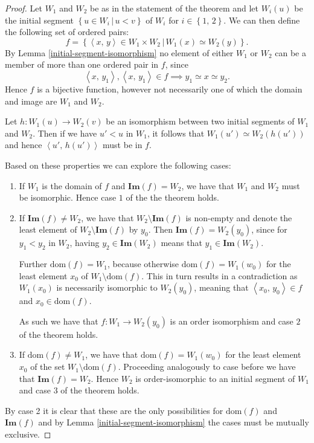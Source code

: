 \documentclass[../../main.tex]{subfiles}
\begin{document}
\begin{proof}\cite[Theorem 1]{Jec78}
    Let $W_1$ and $W_2$ be as in the statement of the theorem and let $W_i(u)$ be the initial segment $\left\{u \in W_i \,\vert\, u < v\right\}$ of $W_i$ for $i \in \left\{1,\, 2\right\}$.
    We can then define the following set of ordered pairs:
    $$f = \left\{\left<x,\, y\right> \in W_1 \times W_2 \,\vert\, W_1(x) \simeq W_2(y)\right\}.$$
    By Lemma \ref{initial-segment-isomorphism} no element of either $W_1$ or $W_2$ can be a member of more than one ordered pair in $f$,
    since $$\left<x,\, y_1\right>, \left<x,\, y_1\right> \in f \implies y_1 \simeq x \simeq y_2.$$
    Hence $f$ is a bijective function, however not necessarily one of which the domain and image are $W_1$ and $W_2$.
    
    Let $h: W_1(u) \to W_2(v)$ be an isomorphism between two initial segments of $W_1$ and $W_2$.
    Then if we have $u' < u$ in $W_1$, it follows that $W_1(u') \simeq W_2(h(u'))$ and hence $\left<u',\, h(u')\right>$ must be in $f$.

    Based on these properties we can explore the following cases:
    \begin{enumerate}
        \item If $W_1$ is the domain of $f$ and $\mathbf{Im}(f) = W_2$, we have that $W_1$ and $W_2$ must be isomorphic.
        Hence case $1$ of the the theorem holds.
        \item If $\mathbf{Im}(f) \neq W_2$, we have that $W_2 \setminus \mathbf{Im}(f)$ is non-empty and denote the least element of $W_2 \setminus \mathbf{Im}(f)$ by $y_0$.
        Then $\mathbf{Im}(f) = W_2(y_0)$, since for $y_1 < y_2$ in $W_2$, having $y_2 \in \mathbf{Im}(W_2)$ means that $y_1 \in \mathbf{Im}(W_2)$.

        Further $\text{dom}(f) = W_1$, because otherwise $\text{dom}(f) = W_1(w_0)$ for the least element $x_0$ of $W_1 \setminus \text{dom}(f)$.
        This in turn results in a contradiction as $W_1(x_0)$ is necessarily isomorphic to $W_2(y_0)$, meaning that $\left<x_0,\, y_0\right> \in f$ and $x_0 \in \text{dom}(f)$.

        As such we have that $f: W_1 \to W_2(y_0)$ is an order isomorphism and case $2$ of the theorem holds.
        \item If $\text{dom}(f) \neq W_1$, we have that $\text{dom}(f) = W_1(w_0)$ for the least element $x_0$ of the set $W_1 \setminus \text{dom}(f)$.
        Proceeding analogously to case before we have that $\mathbf{Im}(f) = W_2$. 
        Hence $W_2$ is order-isomorphic to an initial segment of $W_1$ and case $3$ of the theorem holds.
    \end{enumerate}
    By case 2 it is clear that these are the only possibilities for $\text{dom}(f)$ and $\mathbf{Im}(f)$ and by Lemma \ref{initial-segment-isomorphism} the cases must be mutually exclusive.
\end{proof}
\end{document}
